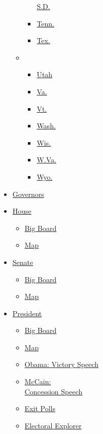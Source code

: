 \begin{itemize}
\begin{itemize}
\begin{itemize}
      \href{../states/south-dakota.html}{S.D.}
    \item
      \href{../states/tennessee.html}{Tenn.}
    \item
      \href{../states/texas.html}{Tex.}
    \end{itemize}
  \item
    \begin{itemize}
    \tightlist
    \item
      \href{../states/utah.html}{Utah}
    \item
      \href{../states/virginia.html}{Va.}
    \item
      \href{../states/vermont.html}{Vt.}
    \item
      \href{../states/washington.html}{Wash.}
    \item
      \href{../states/wisconsin.html}{Wis.}
    \item
      \href{../states/west-virginia.html}{W.Va.}
    \item
      \href{../states/wyoming.html}{Wyo.}
    \end{itemize}
  \end{itemize}
\item
  \href{../governor/votes.html}{Governors}
\item
  \href{../house/votes.html}{House}

  \begin{itemize}
  \tightlist
  \item
    \href{../house/votes.html}{Big Board}
  \item
    \href{../house/map.html}{Map}
  \end{itemize}
\item
  \href{../senate/votes.html}{Senate}

  \begin{itemize}
  \tightlist
  \item
    \href{../senate/votes.html}{Big Board}
  \item
    \href{../senate/map.html}{Map}
  \end{itemize}
\item
  \href{votes.html}{President}

  \begin{itemize}
  \tightlist
  \item
    \href{votes.html}{Big Board}
  \item
    \href{map.html}{Map}
  \item
    \href{speeches/obama-victory-speech.html}{Obama: Victory Speech}
  \item
    \href{speeches/mccain-concession-speech.html}{McCain:\\
    Concession Speech}
  \item
    \href{exit-polls.html}{Exit Polls}
  \item
    \href{explorer.html}{Electoral Explorer}
  \end{itemize}
\end{itemize}

